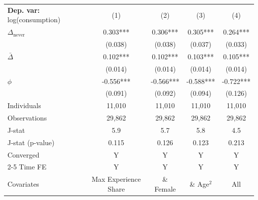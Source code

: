 \begin{tabular}{l cccc} \toprule  \textbf{Dep. var:}  log(consumption) 
                    &\multicolumn{1}{c}{(1)}   &\multicolumn{1}{c}{(2)}   &\multicolumn{1}{c}{(3)}   &\multicolumn{1}{c}{(4)}   \\

\addlinespace
$\Delta_{\text{never}}$&       0.303***&       0.306***&       0.305***&       0.264***\\
                    &     (0.038)   &     (0.038)   &     (0.037)   &     (0.033)   \\

\addlinespace
$\bar{\Delta}$      &       0.102***&       0.102***&       0.103***&       0.105***\\
                    &     (0.014)   &     (0.014)   &     (0.014)   &     (0.014)   \\

\addlinespace
$\phi$              &      -0.556***&      -0.566***&      -0.588***&      -0.722***\\
                    &     (0.091)   &     (0.092)   &     (0.094)   &     (0.126)   \\
\addlinespace
Individuals         &      11,010   &      11,010   &      11,010   &      11,010   \\
Observations        &      29,862   &      29,862   &      29,862   &      29,862   \\
J-stat              &         5.9   &         5.7   &         5.8   &         4.5   \\
J-stat (p-value)    &       0.115   &       0.126   &       0.123   &       0.213   \\
Converged           &           Y   &           Y   &           Y   &           Y   \\
\cmidrule{2-5} Time FE & Y & Y & Y & Y \\ Covariates & Max Experience Share & \& Female & \& Age$^2$ & All \\ \bottomrule \end{tabular}
